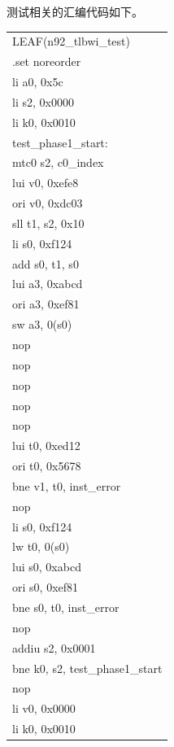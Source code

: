 \documentclass[11pt,utf8]{article}
\begin{document}
{{{测试相关的汇编代码如下。
\begin{center}
	\begin{longtable}{p{15cm}}
		\hline  
LEAF(n92\_tlbwi\_test)\\
{ }{ }{ }{ }.set{ }noreorder\\
{ }{ }{ }{ }li{ }{ }a0,{ }0x5c\\
{ }{ }{ }{ }li{ }s2,{ }0x0000\\
{ }{ }{ }{ }li{ }k0,{ }0x0010\\
test\_phase1\_start:\\
{ }{ }{ }{ }mtc0{ }s2,{ }c0\_index\\
{ }{ }{ }{ }lui{ }v0,{ }0xefe8\\
{ }{ }{ }{ }ori{ }v0,{ }0xdc03\\
{ }{ }{ }{ }sll{ }t1,{ }s2,{ }0x10\\
{ }{ }{ }{ }li{ }s0,{ }0xf124\\
{ }{ }{ }{ }add{ }s0,{ }t1,{ }s0\\
{ }{ }{ }{ }lui{ }a3,{ }0xabcd\\
{ }{ }{ }{ }ori{ }a3,{ }0xef81\\
{ }{ }{ }{ }sw{ }a3,{ }0(s0)\\
{ }{ }{ }{ }nop\\
{ }{ }{ }{ }nop\\
{ }{ }{ }{ }nop\\
{ }{ }{ }{ }nop\\
{ }{ }{ }{ }nop\\
{ }{ }{ }{ }lui{ }t0,{ }0xed12\\
{ }{ }{ }{ }ori{ }t0,{ }0x5678\\
{ }{ }{ }{ }bne{ }v1,{ }t0,{ }inst\_error\\
{ }{ }{ }{ }nop\\
{ }{ }{ }{ }li{ }s0,{ }0xf124\\
{ }{ }{ }{ }lw{ }t0,{ }0(s0)\\
{ }{ }{ }{ }lui{ }s0,{ }0xabcd\\
{ }{ }{ }{ }ori{ }s0,{ }0xef81\\
{ }{ }{ }{ }bne{ }s0,{ }t0,{ }inst\_error\\
{ }{ }{ }{ }nop\\
{ }{ }{ }{ }addiu{ }s2,{ }0x0001\\
{ }{ }{ }{ }bne{ }k0,{ }s2,{ }test\_phase1\_start\\
{ }{ }{ }{ }nop\\
{ }{ }{ }{ }li{ }v0,{ }0x0000\\
{ }{ }{ }{ }li{ }k0,{ }0x0010\\

\end{longtable}
\end{center}}}}
\end{document}
